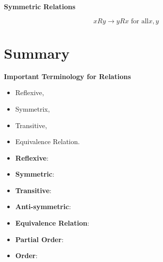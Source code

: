 \documentclass[]{report}
\begin{document}
\textbf{Symmetric Relations}

\[ xRy \rightarrow yRx \mbox{ for all} x,y \]



\section{Summary}
\noindent \textbf{Important Terminology for Relations}
\begin{itemize}
\item Reflexive,
\item Symmetrix,
\item Transitive,
\item Equivalence Relation.
\end{itemize}


\begin{itemize}
\item \textbf{Reflexive}: 
\item \textbf{Symmetric}: 
\item \textbf{Transitive}: 
\item \textbf{Anti-symmetric}: 
\item \textbf{Equivalence Relation}: 
\item \textbf{Partial Order}:
\item \textbf{Order}:
\end{itemize}

\end{document}
